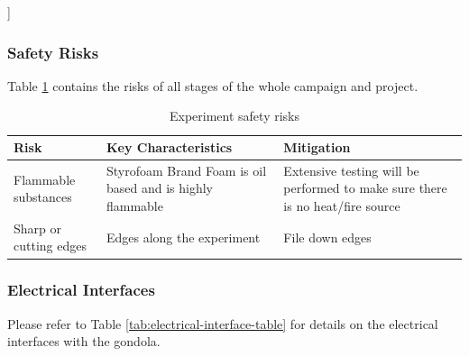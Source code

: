 ]\documentclass[a4paper,12pt,twoside]{article}
\begin{document}
\subsubsection{Safety Risks}
Table \ref{tab:safrisk} contains the risks of all stages of the whole campaign and project.
\begin{table}[H]
\centering

\begin{tabular}{|m{}|m{}|m{}|}
\hline
\textbf{Risk}          & \textbf{Key Characteristics}                              & \textbf{Mitigation}                                                           \\ \hline
Flammable substances    & Styrofoam Brand Foam is oil based and is highly flammable & Extensive testing will be performed to make sure there is no heat/fire source \\ \hline
Sharp or cutting edges & Edges along the experiment                                & File down edges                                                               \\ \hline
\end{tabular}
\caption{Experiment safety risks}
\label{tab:safrisk}
\end{table}
\raggedbottom

\pagebreak
\subsubsection{Electrical Interfaces}

Please refer to Table \ref{tab:electrical-interface-table} for details on the electrical interfaces with the gondola.
\end{document}
